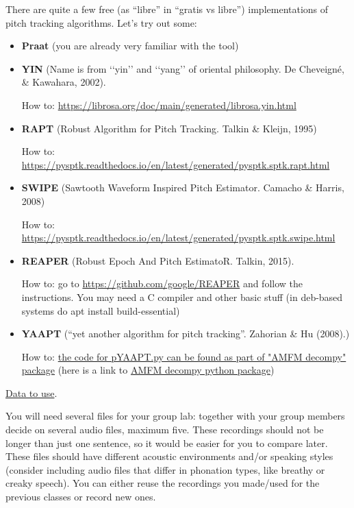 \documentclass{../labbook}
\begin{document}
There are quite a few free (as “libre” in “gratis vs libre”) implementations of pitch tracking algorithms. Let’s try out some:
\begin{itemize}
    \item \textbf{Praat} (you are already very familiar with the tool)
    \item \textbf{YIN} (Name is from ‘‘yin’’ and ‘‘yang’’ of oriental philosophy. De Cheveigné, \& Kawahara, 2002).     
    
    How to: \href{https://librosa.org/doc/main/generated/librosa.yin.html}{https://librosa.org/doc/main/generated/librosa.yin.html}
    
    \item \textbf{RAPT} (Robust Algorithm for Pitch Tracking. Talkin \& Kleijn, 1995)
    
    How to: \href{https://pysptk.readthedocs.io/en/latest/generated/pysptk.sptk.rapt.html}{https://pysptk.readthedocs.io/en/latest/generated/pysptk.sptk.rapt.html}
    
    \item \textbf{SWIPE} (Sawtooth Waveform Inspired Pitch Estimator. Camacho \& Harris, 2008)
    
    How to: \href{https://pysptk.readthedocs.io/en/latest/generated/pysptk.sptk.swipe.html}{https://pysptk.readthedocs.io/en/latest/generated/pysptk.sptk.swipe.html}

    \item \textbf{REAPER} (Robust Epoch And Pitch EstimatoR. Talkin, 2015). 
   
    How to: go to \href{https://github.com/google/REAPER}{https://github.com/google/REAPER} and follow the instructions. You may need a C compiler and other basic stuff (in deb-based systems do apt install build-essential)

    \item \textbf{YAAPT} (``yet another algorithm for pitch tracking''. Zahorian \& Hu (2008).) 
    
    How to: \href{https://github.com/bjbschmitt/AMFM_decompy/blob/master/amfm_decompy/pYAAPT.py}{the code for pYAAPT.py can be found as part of "AMFM decompy" package}
(here is a link to \href{https://github.com/bjbschmitt/AMFM_decompy/}{AMFM decompy python package})
\end{itemize}

\underline{Data to use}.

You will need several files for your group lab: together with your group members decide on several audio files, maximum five. These recordings should not be longer than just one sentence, so it would be easier for you to compare later.
These files should have different acoustic environments and/or speaking styles (consider including audio files that differ in phonation types, like breathy or creaky speech). 
You can either reuse the recordings you made/used for the previous classes or record new ones.
\end{document}
